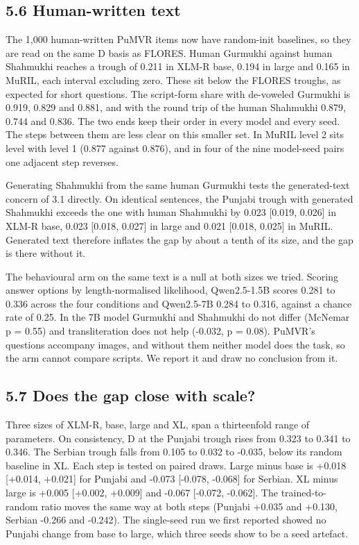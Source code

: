 \hypertarget{human-written-text}{%
\subsection{5.6 Human-written text}\label{human-written-text}}

The 1,000 human-written PuMVR items now have random-init baselines, so
they are read on the same D basis as FLORES. Human Gurmukhi against
human Shahmukhi reaches a trough of 0.211 in XLM-R base, 0.194 in large
and 0.165 in MuRIL, each interval excluding zero. These sit below the
FLORES troughs, as expected for short questions. The script-form share
with de-voweled Gurmukhi is 0.919, 0.829 and 0.881, and with the round
trip of the human Shahmukhi 0.879, 0.744 and 0.836. The two ends keep
their order in every model and every seed. The steps between them are
less clear on this smaller set. In MuRIL level 2 sits level with level 1
(0.877 against 0.876), and in four of the nine model-seed pairs one
adjacent step reverses.

Generating Shahmukhi from the same human Gurmukhi tests the
generated-text concern of 3.1 directly. On identical sentences, the
Punjabi trough with generated Shahmukhi exceeds the one with human
Shahmukhi by 0.023 {[}0.019, 0.026{]} in XLM-R base, 0.023 {[}0.018,
0.027{]} in large and 0.021 {[}0.018, 0.025{]} in MuRIL. Generated text
therefore inflates the gap by about a tenth of its size, and the gap is
there without it.

The behavioural arm on the same text is a null at both sizes we tried.
Scoring answer options by length-normalised likelihood, Qwen2.5-1.5B
scores 0.281 to 0.336 across the four conditions and Qwen2.5-7B 0.284 to
0.316, against a chance rate of 0.25. In the 7B model Gurmukhi and
Shahmukhi do not differ (McNemar p = 0.55) and transliteration does not
help (-0.032, p = 0.08). PuMVR's questions accompany images, and without
them neither model does the task, so the arm cannot compare scripts. We
report it and draw no conclusion from it.

\hypertarget{does-the-gap-close-with-scale}{%
\subsection{5.7 Does the gap close with
scale?}\label{does-the-gap-close-with-scale}}

Three sizes of XLM-R, base, large and XL, span a thirteenfold range of
parameters. On consistency, D at the Punjabi trough rises from 0.323 to
0.341 to 0.346. The Serbian trough falls from 0.105 to 0.032 to -0.035,
below its random baseline in XL. Each step is tested on paired draws.
Large minus base is +0.018 {[}+0.014, +0.021{]} for Punjabi and -0.073
{[}-0.078, -0.068{]} for Serbian. XL minus large is +0.005 {[}+0.002,
+0.009{]} and -0.067 {[}-0.072, -0.062{]}. The trained-to-random ratio
moves the same way at both steps (Punjabi +0.035 and +0.130, Serbian
-0.266 and -0.242). The single-seed run we first reported showed no
Punjabi change from base to large, which three seeds show to be a seed
artefact.

